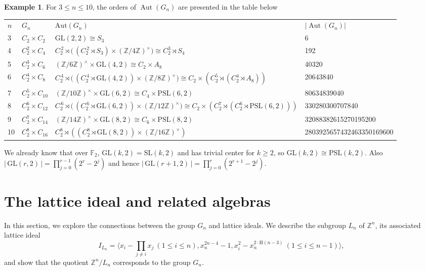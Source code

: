 \documentclass[11pt]{amsart}
\newcommand{\F}{\mathbb{F}}
\newcommand{\Z}{\mathbb{Z}}
\theoremstyle{plain}
\theoremstyle{definition}
\newtheorem{ex}[theorem]{Example}
\theoremstyle{remark}
\begin{document}
\begin{ex}
	For \(3 \leq n\leq 10 \), the orders of $\operatorname{Aut}(G_n)$ are presented in the table below
	
	\begin{adjustbox}{width=\textwidth}
		\begin{tabular}{llll}
			\(n\) & \(G_n\) & \(\text{Aut}(G_n)\)  & \( |\operatorname{Aut}(G_n)| \) \\
			3 & \(C_2 \times C_2\) & \(\mathrm{GL}(2,2) \cong S_3\) &  6 \\
			4 & \(C_2^2 \times C_4\) & \( C_2^{\,2} \rtimes\big(\,(C_2^{\,2}\rtimes S_3)\times (\Z/4\Z)^\times\big) \cong  C_2^3 \rtimes  S_4\) & 192 \\%
			5 & \(C_2^3 \times C_6\) & \((\Z/6\Z)^\times\times \mathrm{GL}(4,2)\cong C_2 \times A_8\) & 40320\\
			6 & \(C_2^4 \times C_8 \) & \( C_2^{\,4}\rtimes\big(\,(C_2^{\,4}\rtimes \mathrm{GL}(4,2))\times (\Z/8\Z)^\times\big) \cong C_2 \times (C_2^5 \rtimes (C_2^4 \rtimes A_8))\) & 20643840\\
			7 & \(C_2^5 \times C_{10}\) & \( (\Z/10\Z)^\times\times \mathrm{GL}(6,2)\cong C_4 \times \mathrm{PSL}(6,2)\) & 80634839040\\
			8 & \(C_2^6 \times C_{12}\) & \( C_2^{\,6}\rtimes\big(\,(C_2^{\,6}\rtimes \mathrm{GL}(6,2))\times (\Z/12\Z)^\times\big) \cong C_2 \times (C_2^7 \rtimes (C_2^6 \rtimes \mathrm{PSL}(6,2)))\) & 330280300707840 \\
			9 & \(C_2^7 \times C_{14}\) & \( (\Z/14\Z)^\times\times \mathrm{GL}(8,2) \cong C_6 \times \mathrm{PSL}(8, 2)\) & 32088382615270195200\\
			10 & \(C_2^8 \times C_{16}\) & \(C_2^8 \rtimes (( C_2^8 \rtimes \mathrm{GL}(8, 2) )\times (\Z/16\Z)^\times)\) & 2803925657432463350169600  
			
		\end{tabular}
	\end{adjustbox}

\medskip
\noindent
We already know that over $\F_2$, $\mathrm{GL}(k,2)=\mathrm{SL}(k,2)$ and has trivial center for $k\ge2$, so
$\mathrm{GL}(k,2)\cong \mathrm{PSL}(k,2)$. Also $|\,\mathrm{GL}(r,2)\,|=\prod_{j=0}^{r-1}(2^{r}-2^{j})$
and hence $|\,\mathrm{GL}(r\!+\!1,2)\,|=\prod_{j=0}^{r}(2^{r+1}-2^{j})$.

\end{ex}

\section{The lattice ideal and related algebras}
\label{sec:lattices}
In this section, we explore the connections between the group \(G_n\) and lattice ideals. We describe the subgroup \( L_n \) of \( \Z^n \), its associated lattice ideal 
\[
	I_{L_n} = \langle x_i - \prod_{j \neq i}x_j \ (1 \leq i \leq n), x_n^{2n-4} - 1, x_i^2 - x_n^{2 \cdot \text{H}(n-3)} \ (1 \leq i \leq n-1) \rangle, 
\]
and show that the quotient \( \Z^n/ L_n \) corresponds to the group \( G_n \). 
\end{document}
